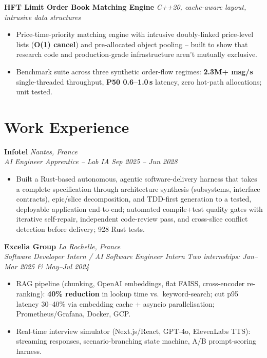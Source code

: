 \documentclass[10pt]{article}
\newcommand{\entry}[4]{%
  \noindent\textbf{#1} \hfill \textit{#2} \\
  \textit{#3} \hfill \textit{#4}\\[-0.3em]
}
\newcommand{\projectentry}[2]{%
  \noindent\textbf{#1} \hfill \textit{#2}\\[-0.3em]
}
\begin{document}
\projectentry{HFT Limit Order Book Matching Engine}{C++20, cache-aware layout, intrusive data structures}
\begin{itemize}
  \item Price-time-priority matching engine with intrusive doubly-linked price-level lists (\textbf{O(1) cancel}) and pre-allocated object pooling -- built to show that research code and production-grade infrastructure aren't mutually exclusive.
  \item Benchmark suite across three synthetic order-flow regimes: \textbf{2.3M+ msg/s} single-threaded throughput, \textbf{P50 0.6--1.0\,\textmu s} latency, zero hot-path allocations; unit tested.
\end{itemize}

\section*{Work Experience}
\entry{Infotel}{Nantes, France}{AI Engineer Apprentice -- Lab IA}{Sep 2025 -- Jun 2028}
\begin{itemize}
  \item Built a Rust-based autonomous, agentic software-delivery harness that takes a complete specification through architecture synthesis (subsystems, interface contracts), epic/slice decomposition, and TDD-first generation to a tested, deployable application end-to-end; automated compile+test quality gates with iterative self-repair, independent code-review pass, and cross-slice conflict detection before delivery; 928 Rust tests.
\end{itemize}
\entry{Excelia Group}{La Rochelle, France}{Software Developer Intern / AI Software Engineer Intern}{Two internships: Jan--Mar 2025 \& May--Jul 2024}
\begin{itemize}
  \item RAG pipeline (chunking, OpenAI embeddings, flat FAISS, cross-encoder re-ranking): \textbf{40\% reduction} in lookup time vs.\ keyword-search; cut p95 latency 30--40\% via embedding cache + asyncio parallelisation; Prometheus/Grafana, Docker, GCP.
  \item Real-time interview simulator (Next.js/React, GPT-4o, ElevenLabs TTS): streaming responses, scenario-branching state machine, A/B prompt-scoring harness.
\end{itemize}
\end{document}
